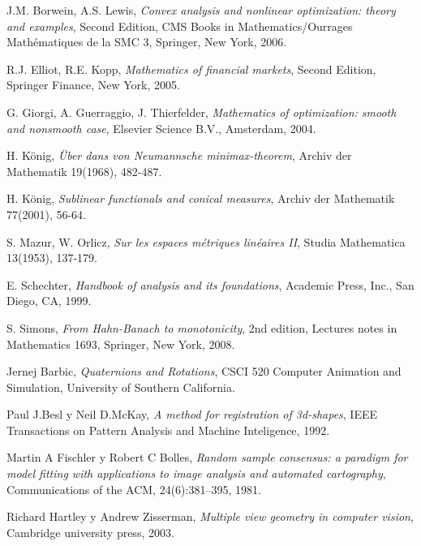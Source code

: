 \documentclass[a4paper,11pt]{book}
\begin{document}
\nocite{*}
% 
% 
\begin{thebibliography}{X}
	 J.M. Borwein, A.S. Lewis, \textsl{Convex analysis and nonlinear optimization: theory and examples}, Second Edition, CMS Books in Mathematics/Ourrages Mathématiques de la SMC 3, Springer, New York, 2006.
	
	 R.J. Elliot, R.E. Kopp, \textsl{Mathematics of financial markets}, Second Edition, Springer Finance, New York, 2005.
	
	 G. Giorgi, A. Guerraggio, J. Thierfelder, \textsl{Mathematics of optimization: smooth and nonsmooth case}, Elsevier Science B.V., Amsterdam, 2004.
		
	 H. König, \textsl{Über dans von Neumannsche minimax-theorem}, Archiv der Mathematik 19(1968), 482-487.
	
	 H. König, \textsl{Sublinear functionals and conical measures}, Archiv der Mathematik 77(2001), 56-64.
	
	 S. Mazur, W. Orlicz, \textsl{Sur les espaces métriques linéaires II}, Studia Mathematica 13(1953), 137-179.

	 E. Schechter,
	\textsl{Handbook of analysis and its foundations}, Academic Press, Inc., San Diego, CA, 1999.
	
	 S. Simons, \textsl{From Hahn-Banach to monotonicity}, 2nd edition, Lectures notes in Mathematics 1693, Springer, New York, 2008.
	
	 Jernej Barbic, \textsl{Quaternions and Rotations}, CSCI 520 Computer Animation and Simulation, University of Southern California.
	
	 Paul J.Besl y Neil D.McKay, \textsl{A method for registration of 3d-shapes}, IEEE Transactions on Pattern Analysis and Machine Inteligence, 1992.
	
	 Martin A Fischler y Robert C Bolles, \textsl{Random sample consensus: a paradigm for model fitting with applications to image analysis and automated cartography}, Communications of the ACM, 24(6):381–395, 1981.
	
	 Richard Hartley y Andrew Zisserman, \textsl{Multiple view geometry in computer vision}, Cambridge university press, 2003.
	

\end{thebibliography}
\end{document}
